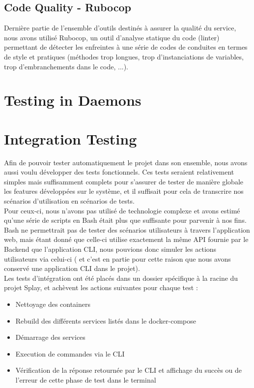 \documentclass{eplmastersthesis}
\begin{document}
      \subsection{Code Quality - Rubocop}

        Dernière partie de l'ensemble d'outils destinés à assurer la qualité du
        service, nous avons utilisé Rubocop, un outil d'analyse statique du code
        (linter) permettant de détecter les enfreintes à une série de codes
        de conduites en termes de style et pratiques (méthodes trop longues,
        trop d'instanciations de variables, trop d'embranchements dans le code,
        ...).

    \section{Testing in Daemons}


    \section{Integration Testing}

      Afin de pouvoir tester automatiquement le projet dans son ensemble, nous
      avons aussi voulu développer des tests fonctionnels. Ces tests seraient
      relativement simples mais suffisamment complets pour s'assurer de
      tester de manière globale les features développées sur le système, et
      il suffisait pour cela de transcrire nos scénarios d'utilisation en
      scénarios de tests.\\

      Pour ceux-ci, nous n'avons pas utilisé de technologie complexe et avons
      estimé qu'une série de scripts en Bash était plus que suffisante pour
      parvenir à nos fins. Bash ne permettrait pas de tester des scénarios
      utilisateurs à travers l'application web, mais étant donné que celle-ci
      utilise exactement la même API fournie par le Backend que l'application
      CLI, nous pouvions donc simuler les actions utilisateurs via celui-ci (
      et c'est en partie pour cette raison que nous avons conservé une
      application CLI dans le projet).\\

      Les tests d'intégration ont été placés dans un dossier spécifique à la
      racine du projet Splay, et achèvent les actions suivantes pour chaque
      test : \\

      \begin{itemize}
        \item Nettoyage des containers
        \item Rebuild des différents services listés dans le docker-compose
        \item Démarrage des services
        \item Execution de commandes via le CLI
        \item Vérification de la réponse retournée par le CLI et affichage du
        succès ou de l'erreur de cette phase de test dans le terminal
      \end{itemize}
\end{document}
